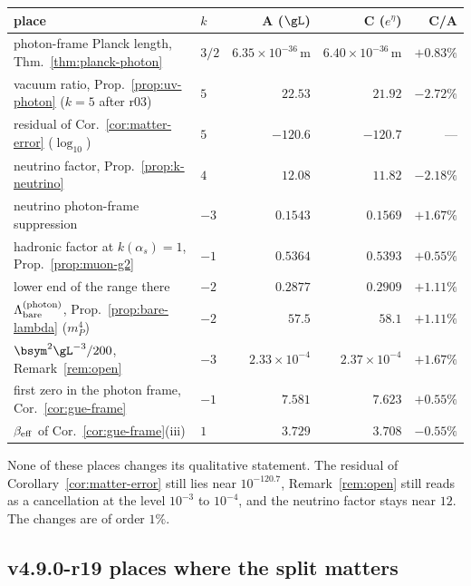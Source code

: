 \begin{center}
\small
\begin{tabular}{@{}>{\raggedright\arraybackslash}p{}>{\raggedright\arraybackslash}p{}rrr@{}}
\toprule
place & \(k\) & A (\(\gL\)) & C (\(e^\eta\)) & C/A\\
\midrule
photon-frame Planck length, Thm.~\ref{thm:planck-photon} & \(3/2\) & \(6.35\times10^{-36}\,\mathrm m\) & \(6.40\times10^{-36}\,\mathrm m\) & \(+0.83\%\)\\
vacuum ratio, Prop.~\ref{prop:uv-photon} (\(k=5\) after r03) & \(5\) & \(22.53\) & \(21.92\) & \(-2.72\%\)\\
residual of Cor.~\ref{cor:matter-error} (\(\log_{10}\)) & \(5\) & \(-120.6\) & \(-120.7\) & ---\\
neutrino factor, Prop.~\ref{prop:k-neutrino} & \(4\) & \(12.08\) & \(11.82\) & \(-2.18\%\)\\
neutrino photon-frame suppression & \(-3\) & \(0.1543\) & \(0.1569\) & \(+1.67\%\)\\
hadronic factor at \(k(\alpha_s)=1\), Prop.~\ref{prop:muon-g2} & \(-1\) & \(0.5364\) & \(0.5393\) & \(+0.55\%\)\\
lower end of the range there & \(-2\) & \(0.2877\) & \(0.2909\) & \(+1.11\%\)\\
\(\Lambda_{\rm bare}^{(\mathrm{photon})}\), Prop.~\ref{prop:bare-lambda} (\(m_P^4\)) & \(-2\) & \(57.5\) & \(58.1\) & \(+1.11\%\)\\
\(\bsym^2\gL^{-3}/200\), Remark~\ref{rem:open} & \(-3\) & \(2.33\times10^{-4}\) & \(2.37\times10^{-4}\) & \(+1.67\%\)\\
first zero in the photon frame, Cor.~\ref{cor:gue-frame} & \(-1\) & \(7.581\) & \(7.623\) & \(+0.55\%\)\\
\(\beta_{\rm eff}\) of Cor.~\ref{cor:gue-frame}(iii) & \(1\) & \(3.729\) & \(3.708\) & \(-0.55\%\)\\
\bottomrule
\end{tabular}
\end{center}
None of these places changes its qualitative statement.  The residual of Corollary~\ref{cor:matter-error} still lies near
\(10^{-120.7}\), Remark~\ref{rem:open} still reads as a cancellation at the level \(10^{-3}\) to \(10^{-4}\), and the neutrino factor
stays near \(12\).  The changes are of order \(1\%\).

\subsection*{v4.9.0-r19 places where the split matters}
\label{subsec:v490-r19-matters}

